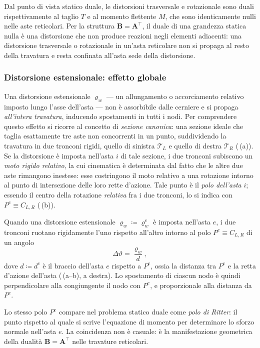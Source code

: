 Dal punto di vista statico duale, le distorsioni
trasversale e rotazionale sono duali rispettivamente
al taglio $T$ e al momento flettente $M$, che sono
identicamente nulli nelle aste reticolari. Per la
struttura $\bm{B} = \bm{A}^\top$, il duale di una
grandezza statica nulla è una distorsione che non
produce reazioni negli elementi adiacenti: una
distorsione trasversale o rotazionale in un'asta
reticolare non si propaga al resto della travatura
e resta confinata all'asta sede della distorsione.


\subsubsection{Distorsione estensionale: effetto globale}
Una distorsione estensionale $\varrho_w$ --- un allungamento o
accorciamento relativo imposto lungo l'asse dell'asta --- non è
assorbibile dalle cerniere e si propaga \emph{all'intera travatura},
inducendo spostamenti in tutti i nodi. Per comprendere questo effetto
si ricorre al concetto di \emph{sezione canonica}: una sezione ideale
che taglia esattamente tre aste non concorrenti in un punto, 
suddividendo la travatura in due tronconi rigidi,
quello di sinistra $\mathcal{T}_L$ e quello di destra
$\mathcal{T}_R$ (\,(a)).
Se la distorsione è imposta nell'asta
$i$ di tale sezione, i due tronconi subiscono un \emph{moto rigido
	relativo}, la cui cinematica è determinata dal fatto che le altre due
aste rimangono inestese: esse costringono il moto relativo a una
rotazione intorno al punto di intersezione delle loro rette d'azione.
Tale punto è il \emph{polo dell'asta} $i$; essendo il centro della
rotazione \emph{relativa} fra i due tronconi, lo si indica con
$P^e\equiv C_{L,R}$ (\,(b)).

\begin{oss}
	Quando una distorsione estensionale $\varrho_w\coloneqq \varrho_w^e$ è imposta nell'asta
	$e$, i due tronconi ruotano rigidamente l'uno rispetto all'altro
	intorno al polo $P^e\equiv C_{L,R}$ di un angolo
	\begin{equation}\label{eq:rotazione_polo}
		\Delta\vartheta = \frac{\varrho_w}{d},
	\end{equation}
	dove $d\coloneqq d^e$ è il braccio dell'asta $e$ rispetto a $P^e$, ossia la
	distanza tra $P^e$ e la retta d'azione dell'asta
	(\,(a--b), a destra). Lo spostamento di ciascun nodo è
	quindi perpendicolare alla congiungente il nodo con $P^e$, e
	proporzionale alla distanza da $P^e$.
	
	Lo stesso polo $P^e$ compare nel problema statico duale come
	\emph{polo di Ritter}: il punto rispetto al quale si scrive
	l'equazione di momento per determinare lo sforzo normale nell'asta
	$e$. La coincidenza non è casuale: è la manifestazione geometrica
	della dualità $\bm{B} = \bm{A}^{\top}$ nelle travature reticolari.
\end{oss}

